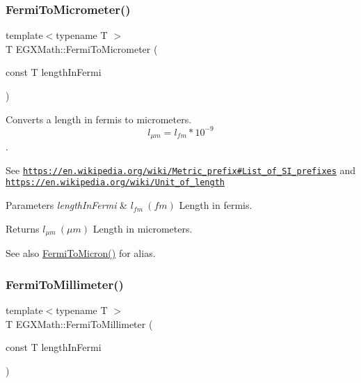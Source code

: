 \subsubsection{\texorpdfstring{Fermi\+To\+Micrometer()}{FermiToMicrometer()}}
{\footnotesize\ttfamily template$<$typename T $>$ \\
T E\+G\+X\+Math\+::\+Fermi\+To\+Micrometer (\begin{DoxyParamCaption}\item[{const T}]{length\+In\+Fermi }\end{DoxyParamCaption})}



Converts a length in fermis to micrometers. \[ l_{\mu m}=l_{fm} * 10^{-9} \]. 

See \href{https://en.wikipedia.org/wiki/Metric_prefix#List_of_SI_prefixes}{\tt https\+://en.\+wikipedia.\+org/wiki/\+Metric\+\_\+prefix\#\+List\+\_\+of\+\_\+\+S\+I\+\_\+prefixes} and \href{https://en.wikipedia.org/wiki/Unit_of_length}{\tt https\+://en.\+wikipedia.\+org/wiki/\+Unit\+\_\+of\+\_\+length} 
\begin{DoxyParams}{Parameters}
{\em length\+In\+Fermi} & $ l_{fm}\ (fm)$ Length in fermis. \\
\hline
\end{DoxyParams}
\begin{DoxyReturn}{Returns}
$ l_{\mu m}\ (\mu m)$ Length in micrometers. 
\end{DoxyReturn}
\begin{DoxySeeAlso}{See also}
\mbox{\hyperlink{group___e_g_x_math-_conversions-_length_conversions-_non-_s_i-_fermi-_non-_s_i_ga8a55f7fbfb5e78f8b22efaeaac18f63b}{Fermi\+To\+Micron()}} for alias. 
\end{DoxySeeAlso}
\mbox{\label{group___e_g_x_math-_conversions-_length_conversions-_non-_s_i-_fermi-_s_i_ga189607f0f4e5661cc0e77f93ac5be3f1}} 
\subsubsection{\texorpdfstring{Fermi\+To\+Millimeter()}{FermiToMillimeter()}}
{\footnotesize\ttfamily template$<$typename T $>$ \\
T E\+G\+X\+Math\+::\+Fermi\+To\+Millimeter (\begin{DoxyParamCaption}\item[{const T}]{length\+In\+Fermi }\end{DoxyParamCaption})}



